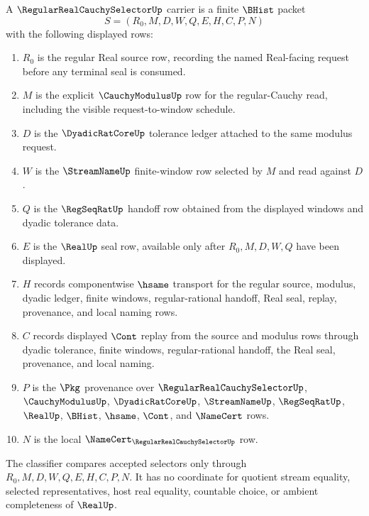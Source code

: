 \begin{definition}
\label{def:regular-real-cauchy-selector-carrier}
A $\RegularRealCauchySelectorUp$ carrier is a finite $\BHist$ packet
$$
S=(R_0,M,D,W,Q,E,H,C,P,N)
$$
with the following displayed rows:
\begin{enumerate}
\item $R_0$ is the regular Real source row, recording the named Real-facing request before any terminal seal is consumed.
\item $M$ is the explicit $\CauchyModulusUp$ row for the regular-Cauchy read, including the visible request-to-window schedule.
\item $D$ is the $\DyadicRatCoreUp$ tolerance ledger attached to the same modulus request.
\item $W$ is the $\StreamNameUp$ finite-window row selected by $M$ and read against $D$.
\item $Q$ is the $\RegSeqRatUp$ handoff row obtained from the displayed windows and dyadic tolerance data.
\item $E$ is the $\RealUp$ seal row, available only after $R_0,M,D,W,Q$ have been displayed.
\item $H$ records componentwise $\hsame$ transport for the regular source, modulus, dyadic ledger, finite windows, regular-rational handoff, Real seal, replay, provenance, and local naming rows.
\item $C$ records displayed $\Cont$ replay from the source and modulus rows through dyadic tolerance, finite windows, regular-rational handoff, the Real seal, provenance, and local naming.
\item $P$ is the $\Pkg$ provenance over $\RegularRealCauchySelectorUp$, $\CauchyModulusUp$, $\DyadicRatCoreUp$, $\StreamNameUp$, $\RegSeqRatUp$, $\RealUp$, $\BHist$, $\hsame$, $\Cont$, and $\NameCert$ rows.
\item $N$ is the local $\NameCert_{\RegularRealCauchySelectorUp}$ row.
\end{enumerate}
The classifier compares accepted selectors only through $R_0,M,D,W,Q,E,H,C,P,N$. It has no coordinate for quotient stream equality, selected representatives, host real equality, countable choice, or ambient completeness of $\RealUp$.
\end{definition}

